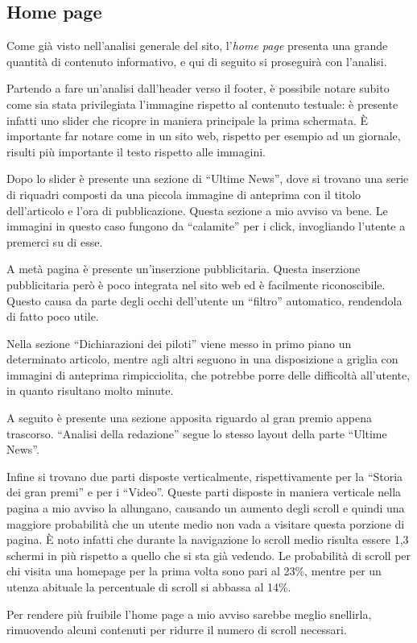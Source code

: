 \subsection{Home page}
Come già visto nell'analisi generale del sito, l'\textit{home page} presenta
una grande quantità di contenuto informativo, e qui di seguito si proseguirà con
l'analisi.

Partendo a fare un'analisi dall'header verso il footer, è possibile notare
subito come sia stata privilegiata l'immagine rispetto al contenuto testuale:
è presente infatti uno slider che ricopre in maniera principale la prima
schermata. È importante far notare come in un sito web, rispetto
per esempio ad un giornale, risulti più importante il testo rispetto alle
immagini.

Dopo lo slider è presente una sezione di ``Ultime News'', dove si trovano
una serie di riquadri composti da una piccola immagine di anteprima con il
titolo dell'articolo e l'ora di pubblicazione. Questa sezione a mio avviso va
bene. Le immagini in questo caso fungono da ``calamite'' per i click,
invogliando l'utente a premerci su di esse.

A metà pagina è presente un'inserzione pubblicitaria. Questa inserzione
pubblicitaria però è poco integrata nel sito web ed è facilmente riconoscibile.
Questo causa da parte degli occhi dell'utente un ``filtro'' automatico,
rendendola di fatto poco utile.

Nella sezione ``Dichiarazioni dei piloti'' viene messo in primo piano un
determinato articolo, mentre agli altri seguono in una disposizione a griglia
con immagini di anteprima rimpicciolita, che potrebbe porre delle difficoltà
all'utente, in quanto risultano molto minute.

A seguito è presente una sezione apposita riguardo al gran premio appena
trascorso. ``Analisi della redazione'' segue lo stesso layout della parte
``Ultime News''.

Infine si trovano due parti disposte verticalmente, rispettivamente per la
``Storia dei gran premi'' e per i ``Video''. Queste parti disposte in maniera
verticale nella pagina a mio avviso la allungano, causando un aumento degli
scroll e quindi una maggiore probabilità che un utente medio non vada a visitare
questa porzione di pagina. È noto infatti che durante la navigazione lo scroll
medio risulta essere 1,3 schermi in più rispetto a quello che si sta già
vedendo. Le probabilità di scroll per chi visita una homepage per la prima
volta sono pari al 23\%, mentre per un utenza abituale la percentuale di scroll
si abbassa al 14\%.

Per rendere più fruibile l'home page a mio avviso sarebbe meglio snellirla,
rimuovendo alcuni contenuti per ridurre il numero di scroll necessari.
